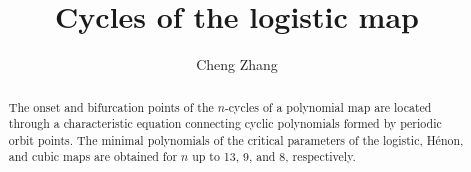 \documentclass{ws-ijbc}
\begin{document}
\newcommand{\odd}{\mathrm{odd}}

\newcommand{\vct}[1]{\mathbf{#1}}




\newcommand{\vx}{\vct x}
\newcommand{\Bset}{\mathcal B}
\newcommand{\NB}{N_\Bset}
\newcommand{\RX}{(R, \lambda)}

\newcommand{\eq}{Eq.}
\newcommand{\eqs}{Eqs.}
\newcommand{\req}[1]{(\ref{eq:#1})}
\newcommand{\refeq}[1]{\eq\,\req{#1}}
\newcommand{\refeqs}[1]{\eqs\,\req{#1}}
\newcommand{\reqsub}[2]{(\ref{eq:#1}#2)}
\newcommand{\refeqsub}[2]{\eq\,\reqsub{#1}{#2}}
\newcommand{\refeqssub}[2]{\eqs\,\reqsub{#1}{#2}}

\newcommand{\refthm}[1]{Theorem \ref{thm:#1}}
\newcommand{\refthms}[1]{Theorems \ref{thm:#1}}
\newcommand{\refsec}[1]{Section \ref{sec:#1}}
\newcommand{\refsecs}[1]{Sections \ref{sec:#1}}
\newcommand{\refapd}[1]{Appendix \ref{apd:#1}}
\newcommand{\reftab}[1]{Table \ref{tab:#1}}
\newcommand{\reftabs}[1]{Tables \ref{tab:#1}}
\newcommand{\reffig}[1]{Fig. \ref{fig:#1}}
\newcommand{\reffigs}[1]{Figs. \ref{fig:#1}}



\catchline{}{}{}{}{}




\title{Cycles of the logistic map}
\author{Cheng Zhang}
\address{Applied Physics Program \& Department of Bioengineering,
Rice University, Houston, TX 77005, USA}

\maketitle


\begin{history}
\received{}
\end{history}


\begin{abstract}
%
The onset and bifurcation points of the $n$-cycles of
  a polynomial map are located
  through a characteristic equation
  connecting cyclic polynomials formed by periodic orbit points.
The minimal polynomials of the critical parameters
  of the logistic, H\'enon, and cubic maps are obtained
  for $n$ up to 13, 9, and 8,
  respectively.
%
\end{abstract}
\end{document}
